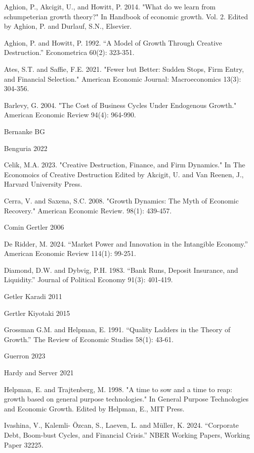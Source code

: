 \documentclass[a4paper,12pt]{article}
\begin{document}
\begin{thebibliography}{9}
    \item Aghion, P., Akcigit, U., and Howitt, P. 2014. "What do we learn from schumpeterian growth theory?" In Handbook of economic growth. Vol. 2. Edited by Aghion, P. and Durlauf, S.N., Elsevier.
    \item Aghion, P. and Howitt, P. 1992. “A Model of Growth Through Creative Destruction.” Econometrica 60(2): 323-351.
    \item Ates, S.T. and Saffie, F.E. 2021. "Fewer but Better: Sudden Stops, Firm Entry, and Financial Selection." American Economic Journal: Macroeconomics 13(3): 304-356.
    \item Barlevy, G. 2004. "The Cost of Business Cycles Under Endogenous Growth." American Economic Review 94(4): 964-990.
    \item Bernanke BG
    \item Benguria 2022
    \item Celik, M.A. 2023. "Creative Destruction, Finance, and Firm Dynamics." In The Economoics of Creative Destruction Edited by Akcigit, U. and Van Reenen, J., Harvard University Press.
    \item Cerra, V. and Saxena, S.C. 2008. "Growth Dynamics: The Myth of Economic Recovery." American Economic Review. 98(1): 439-457.
    \item Comin Gertler 2006
    \item De Ridder, M. 2024. “Market Power and Innovation in the Intangible Economy.” American Economic Review 114(1): 99-251.
    \item Diamond, D.W. and Dybvig, P.H. 1983. “Bank Runs, Deposit Insurance, and Liquidity.” Journal of Political Economy 91(3): 401-419.
    \item Getler Karadi 2011
    \item Gertler Kiyotaki 2015
    \item Grossman G.M. and Helpman, E. 1991. “Quality Ladders in the Theory of Growth.” The Review of Economic Studies 58(1): 43-61.
    \item Guerron 2023
    \item Hardy and Server 2021
    \item Helpman, E. and Trajtenberg, M. 1998. "A time to sow and a time to reap: growth based on general purpose
technologies." In General Purpose Technologies and Economic Growth. Edited by Helpman, E., MIT Press.
    \item Ivashina, V., Kalemli- Özcan, S., Laeven, L. and Müller, K. 2024. “Corporate Debt, Boom-bust Cycles, and Financial Crisis.” NBER Working Papers, Working Paper 32225.

\end{thebibliography}
\end{document}
